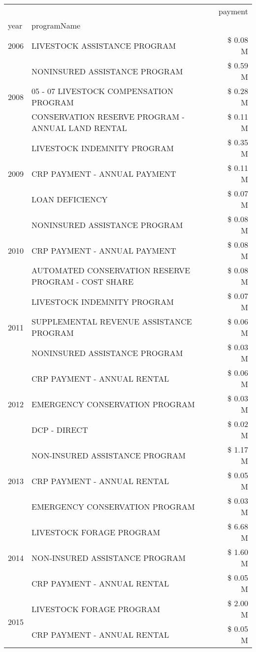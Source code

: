 \begin{tabular}{llr}
\toprule
 &  & payment \\
year & programName &  \\
\midrule
2006 & LIVESTOCK ASSISTANCE PROGRAM & \$ 0.08 M \\
\cline{1-3}
\multirow[t]{3}{*}{2008} & NONINSURED ASSISTANCE PROGRAM & \$ 0.59 M \\
 & 05 - 07 LIVESTOCK COMPENSATION PROGRAM & \$ 0.28 M \\
 & CONSERVATION RESERVE PROGRAM - ANNUAL LAND RENTAL & \$ 0.11 M \\
\cline{1-3}
\multirow[t]{3}{*}{2009} & LIVESTOCK INDEMNITY PROGRAM & \$ 0.35 M \\
 & CRP PAYMENT - ANNUAL PAYMENT & \$ 0.11 M \\
 & LOAN DEFICIENCY & \$ 0.07 M \\
\cline{1-3}
\multirow[t]{3}{*}{2010} & NONINSURED ASSISTANCE PROGRAM & \$ 0.08 M \\
 & CRP PAYMENT - ANNUAL PAYMENT & \$ 0.08 M \\
 & AUTOMATED CONSERVATION RESERVE PROGRAM - COST SHARE & \$ 0.08 M \\
\cline{1-3}
\multirow[t]{3}{*}{2011} & LIVESTOCK INDEMNITY PROGRAM & \$ 0.07 M \\
 & SUPPLEMENTAL REVENUE ASSISTANCE PROGRAM & \$ 0.06 M \\
 & NONINSURED ASSISTANCE PROGRAM & \$ 0.03 M \\
\cline{1-3}
\multirow[t]{3}{*}{2012} & CRP PAYMENT - ANNUAL RENTAL & \$ 0.06 M \\
 & EMERGENCY CONSERVATION PROGRAM & \$ 0.03 M \\
 & DCP - DIRECT & \$ 0.02 M \\
\cline{1-3}
\multirow[t]{3}{*}{2013} & NON-INSURED ASSISTANCE PROGRAM & \$ 1.17 M \\
 & CRP PAYMENT - ANNUAL RENTAL & \$ 0.05 M \\
 & EMERGENCY CONSERVATION PROGRAM & \$ 0.03 M \\
\cline{1-3}
\multirow[t]{3}{*}{2014} & LIVESTOCK FORAGE PROGRAM & \$ 6.68 M \\
 & NON-INSURED ASSISTANCE PROGRAM & \$ 1.60 M \\
 & CRP PAYMENT - ANNUAL RENTAL & \$ 0.05 M \\
\cline{1-3}
\multirow[t]{3}{*}{2015} & LIVESTOCK FORAGE PROGRAM & \$ 2.00 M \\
 & CRP PAYMENT - ANNUAL RENTAL & \$ 0.05 M \\

\end{tabular}
